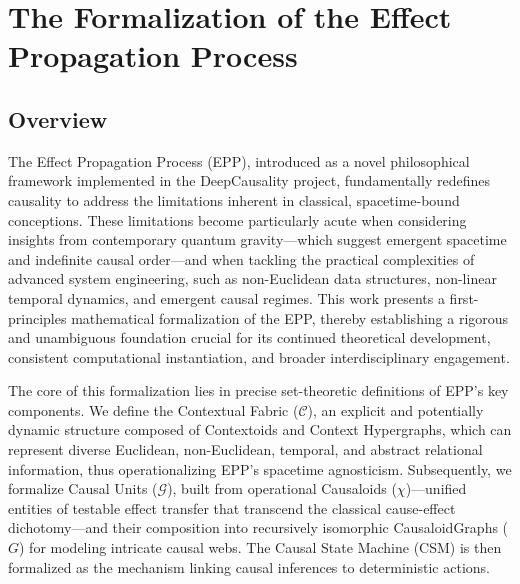 
\newtheorem{definition}{Definition}[section]
\newtheorem{axiom}{Axiom}



\section{The Formalization of the Effect Propagation Process}
\label{sec:formalization}

\subsection{Overview}
\label{sec:overview}

The Effect Propagation Process (EPP), introduced as a novel philosophical framework implemented in the DeepCausality project, fundamentally redefines causality to address the limitations inherent in classical, spacetime-bound conceptions. These limitations become particularly acute when considering insights from contemporary quantum gravity—which suggest emergent spacetime and indefinite causal order—and when tackling the practical complexities of advanced system engineering, such as non-Euclidean data structures, non-linear temporal dynamics, and emergent causal regimes. This work presents a first-principles mathematical formalization of the EPP, thereby establishing a rigorous and unambiguous foundation crucial for its continued theoretical development, consistent computational instantiation, and broader interdisciplinary engagement.

The core of this formalization lies in precise set-theoretic definitions of EPP's key components. We define the {Contextual Fabric} (\(\mathcal{C}\)), an explicit and potentially dynamic structure composed of {Contextoids} and {Context Hypergraphs}, which can represent diverse Euclidean, non-Euclidean, temporal, and abstract relational information, thus operationalizing EPP's spacetime agnosticism. Subsequently, we formalize {Causal Units} (\(\mathcal{G}\)), built from operational {Causaloids} (\(\chi\))—unified entities of testable effect transfer that transcend the classical cause-effect dichotomy—and their composition into recursively isomorphic {CausaloidGraphs} (\(G\)) for modeling intricate causal webs. The Causal State Machine (CSM) is then formalized as the mechanism linking causal inferences to deterministic actions.

